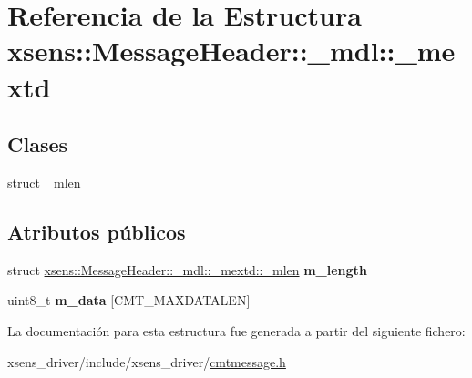 \hypertarget{structxsens_1_1MessageHeader_1_1__mdl_1_1__mextd}{\section{\-Referencia de la \-Estructura xsens\-:\-:\-Message\-Header\-:\-:\-\_\-mdl\-:\-:\-\_\-mextd}
\label{structxsens_1_1MessageHeader_1_1__mdl_1_1__mextd}
}
\subsection*{\-Clases}
\begin{DoxyCompactItemize}
\item 
struct \hyperlink{structxsens_1_1MessageHeader_1_1__mdl_1_1__mextd_1_1__mlen}{\-\_\-mlen}
\end{DoxyCompactItemize}
\subsection*{\-Atributos públicos}
\begin{DoxyCompactItemize}
\item 
\hypertarget{structxsens_1_1MessageHeader_1_1__mdl_1_1__mextd_a49d8654af78af5736fa9dccbd5445228}{struct \*
\hyperlink{structxsens_1_1MessageHeader_1_1__mdl_1_1__mextd_1_1__mlen}{xsens\-::\-Message\-Header\-::\-\_\-mdl\-::\-\_\-mextd\-::\-\_\-mlen} {\bfseries m\-\_\-length}}\label{structxsens_1_1MessageHeader_1_1__mdl_1_1__mextd_a49d8654af78af5736fa9dccbd5445228}

\item 
\hypertarget{structxsens_1_1MessageHeader_1_1__mdl_1_1__mextd_af1461a3925a3fa74341c5aaeafff6a9f}{uint8\-\_\-t {\bfseries m\-\_\-data} \mbox{[}\-C\-M\-T\-\_\-\-M\-A\-X\-D\-A\-T\-A\-L\-E\-N\mbox{]}}\label{structxsens_1_1MessageHeader_1_1__mdl_1_1__mextd_af1461a3925a3fa74341c5aaeafff6a9f}

\end{DoxyCompactItemize}


\-La documentación para esta estructura fue generada a partir del siguiente fichero\-:\begin{DoxyCompactItemize}
\item 
xsens\-\_\-driver/include/xsens\-\_\-driver/\hyperlink{cmtmessage_8h}{cmtmessage.\-h}\end{DoxyCompactItemize}
